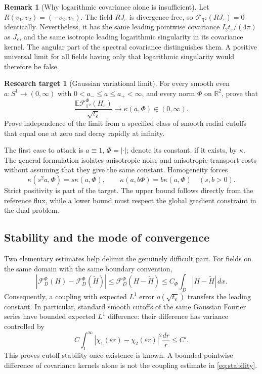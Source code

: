 \documentclass[11pt]{article}
\theoremstyle{definition}
\newtheorem{target}[proposition]{Research target}
\newtheorem{remark}[proposition]{Remark}
\newcommand{\R}{\mathbb R}
\newcommand{\E}{\mathbb E}
\newcommand{\T}{\mathbb T}
\newcommand{\cF}{\mathcal F}
\newcommand{\dd}{\,dx}
\begin{document}
\begin{remark}[Why logarithmic covariance alone is insufficient]
Let $R(v_1,v_2)=(-v_2,v_1)$. The field $RJ_\varepsilon$ is divergence-free,
so $\cF_{\T^2}(RJ_\varepsilon)=0$ identically. Nevertheless, it has the
same leading pointwise covariance $I_2t_\varepsilon/(4\pi)$ as
$J_\varepsilon$, and the same isotropic leading logarithmic singularity
in its covariance kernel. The angular part of the spectral covariance
distinguishes them. A positive universal limit for all fields having
only that logarithmic singularity would therefore be false.
\end{remark}

\begin{target}[Gaussian variational limit]\label{target:gaussian}
For every smooth even $a:S^1\to(0,\infty)$ with
$0<a_-\leq a\leq a_+<\infty$, and every norm $\Phi$ on $\R^2$, prove that
\begin{equation}\label{eq:gaussiantarget}
  \frac{\E\cF_{\T^2}^\Phi(H_\varepsilon)}{\sqrt{t_\varepsilon}}
  \longrightarrow\kappa(a,\Phi)\in(0,\infty).
\end{equation}
Prove independence of the limit from a specified class of smooth radial
cutoffs that equal one at zero and decay rapidly at infinity.
\end{target}
The first case to attack is $a\equiv1$, $\Phi=|\cdot|$; denote its
constant, if it exists, by $\kappa$. The general formulation isolates
anisotropic noise and anisotropic transport costs without assuming that
they give the same constant. Homogeneity forces
\[
  \kappa(s^2a,\Phi)=s\kappa(a,\Phi),\qquad
  \kappa(a,b\Phi)=b\kappa(a,\Phi)\quad(s,b>0).
\]
Strict positivity is part of the target. The upper bound follows directly
from the reference flux, while a lower bound must respect the global
gradient constraint in the dual problem.

\subsection{Stability and the mode of convergence}
Two elementary estimates help delimit the genuinely difficult part.
For fields on the same domain with the same boundary convention,
\begin{equation}\label{eq:stability}
  |\cF_D^\Phi(H)-\cF_D^\Phi(\widetilde H)|
  \leq\cF_D^\Phi(H-\widetilde H)
  \leq C_\Phi\int_D|H-\widetilde H|\dd.
\end{equation}
Consequently, a coupling with expected $L^1$ error
$o(\sqrt{t_\varepsilon})$ transfers the leading constant. In particular,
standard smooth cutoffs of the same Gaussian Fourier series have
bounded expected $L^1$ difference: their difference has variance
controlled by
\[
  C\int_1^\infty
       |\chi_1(\varepsilon r)-\chi_2(\varepsilon r)|^2\frac{dr}{r}
  \leq C'.
\]
This proves cutoff stability once existence is known. A bounded
pointwise difference of covariance kernels alone is not the coupling
estimate in \eqref{eq:stability}.
\end{document}
